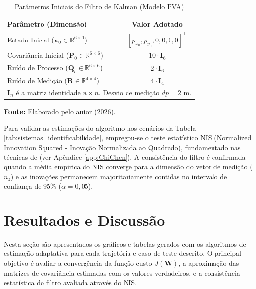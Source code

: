 \documentclass[journal]{IEEEtran}
\begin{document}
\begin{table}[H]
    \centering
    \caption{Parâmetros Iniciais do Filtro de Kalman (Modelo PVA)}
    \label{tab:param_ekf_traj}
    \begin{tabular}{@{}lc@{}}
        \toprule
        \textbf{Parâmetro (Dimensão)} & \textbf{Valor Adotado} \\ \midrule
        Estado Inicial ($\mathbf{x}_0 \in \mathbb{R}^{6 \times 1}$) & $[p_{x_0}, p_{y_0}, 0, 0, 0, 0]^\top$ \\
        Covariância Inicial ($\mathbf{P}_0 \in \mathbb{R}^{6 \times 6}$) & $10 \cdot \mathbf{I}_6$ \\
        Ruído de Processo ($\mathbf{Q}_c \in \mathbb{R}^{6 \times 6}$) & $2 \cdot \mathbf{I}_6$ \\
        Ruído de Medição ($\mathbf{R} \in \mathbb{R}^{4 \times 4}$) & $4 \cdot \mathbf{I}_4$ \\ \bottomrule
        \multicolumn{2}{l}{\footnotesize *$\mathbf{I}_n$ é a matriz identidade $n \times n$. Desvio de medição $dp = 2$ m.}
    \end{tabular}
        \vspace{8pt}
    \centerline{\footnotesize \textbf{Fonte:} Elaborado pelo autor (2026).}
\end{table}

Para validar as estimações do algoritmo nos cenários da Tabela \ref{tab:sistemas_identificabilidade}, empregou-se o teste estatístico NIS (Normalized Innovation Squared - Inovação Normalizada ao Quadrado), fundamentado nas técnicas de \cite{chen2023kalman} (ver Apêndice \ref{app:ChiChen}). A consistência do filtro é confirmada quando a média empírica do NIS converge para a dimensão do vetor de medição ($n_z$) e as inovações permanecem majoritariamente contidas no intervalo de confiança de 95\% ($\alpha = 0,05$).

\section{Resultados e Discussão}
Nesta seção são apresentados os gráficos e tabelas gerados com os algoritmos de estimação adaptativa para cada trajetória e caso de teste descrito. O principal objetivo é avaliar a convergência da função custo $J(\mathbf{W})$, a aproximação das matrizes de covariância estimadas com os valores verdadeiros, e a consistência estatística do filtro avaliada através do NIS.
\end{document}
